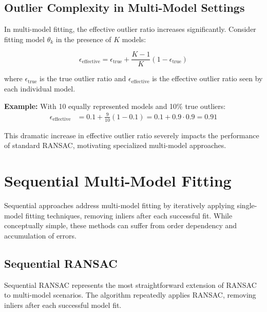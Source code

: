 \documentclass[12pt]{article}
\begin{document}
\subsection{Outlier Complexity in Multi-Model Settings}
\label{subsec:multimodel_outliers}

In multi-model fitting, the effective outlier ratio increases significantly. Consider fitting model $\theta_k$ in the presence of $K$ models:

\begin{equation}
    \epsilon_{\text{effective}} = \epsilon_{\text{true}} + \frac{K-1}{K}(1 - \epsilon_{\text{true}})
    \label{eq:effective_outlier_ratio}
\end{equation}

where $\epsilon_{\text{true}}$ is the true outlier ratio and $\epsilon_{\text{effective}}$ is the effective outlier ratio seen by each individual model.

\textbf{Example:} With 10 equally represented models and 10\% true outliers:
\begin{align}
    \epsilon_{\text{effective}} & = 0.1 + \frac{9}{10}(1 - 0.1) = 0.1 + 0.9 \cdot 0.9 = 0.91
\end{align}

This dramatic increase in effective outlier ratio severely impacts the performance of standard RANSAC, motivating specialized multi-model approaches.

\newpage

\section{Sequential Multi-Model Fitting}
\label{sec:sequential_fitting}

Sequential approaches address multi-model fitting by iteratively applying single-model fitting techniques, removing inliers after each successful fit. While conceptually simple, these methods can suffer from order dependency and accumulation of errors.

\subsection{Sequential RANSAC}
\label{subsec:sequential_ransac}

Sequential RANSAC represents the most straightforward extension of RANSAC to multi-model scenarios. The algorithm repeatedly applies RANSAC, removing inliers after each successful model fit.
\end{document}
